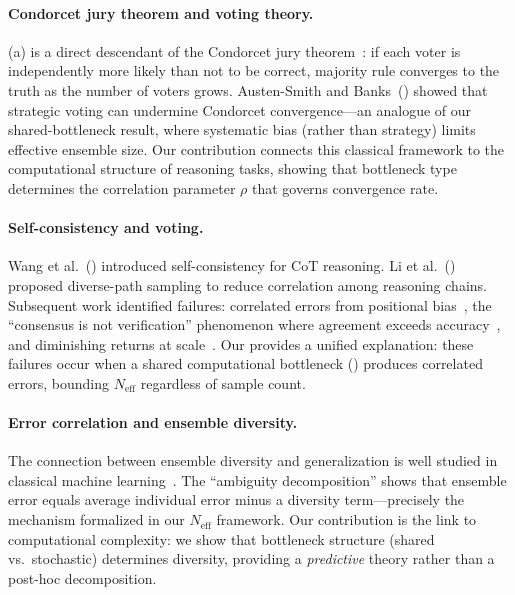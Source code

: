 \documentclass{article}
\theoremstyle{definition}
\theoremstyle{remark}
\begin{document}
\paragraph{Condorcet jury theorem and voting theory.}
(a) is a direct descendant of the Condorcet jury theorem~\citep{condorcet1785essai}: if each voter is independently more likely than not to be correct, majority rule converges to the truth as the number of voters grows.
Austen-Smith and Banks~(\citeyear{austensmith1996information}) showed that strategic voting can undermine Condorcet convergence---an analogue of our shared-bottleneck result, where systematic bias (rather than strategy) limits effective ensemble size.
Our contribution connects this classical framework to the computational structure of reasoning tasks, showing that bottleneck type determines the correlation parameter $\rho$ that governs convergence rate.

\paragraph{Self-consistency and voting.}
Wang et al.~(\citeyear{wang2023selfconsistency}) introduced self-consistency for CoT reasoning.
Li et al.~(\citeyear{li2022diverse}) proposed diverse-path sampling to reduce correlation among reasoning chains.
Subsequent work identified failures: correlated errors from positional bias~\citep{tao2024selfconsistency}, the ``consensus is not verification'' phenomenon where agreement exceeds accuracy~\citep{consensus2026}, and diminishing returns at scale~\citep{singhi2025solve}.
Our  provides a unified explanation: these failures occur when a shared computational bottleneck () produces correlated errors, bounding $N_{\mathrm{eff}}$ regardless of sample count.

\paragraph{Error correlation and ensemble diversity.}
The connection between ensemble diversity and generalization is well studied in classical machine learning~\citep{krogh1994neural,brown2005diversity}.
The ``ambiguity decomposition'' shows that ensemble error equals average individual error minus a diversity term---precisely the mechanism formalized in our $N_{\text{eff}}$ framework.
Our contribution is the link to computational complexity: we show that bottleneck structure (shared vs.\ stochastic) determines diversity, providing a \emph{predictive} theory rather than a post-hoc decomposition.
\end{document}
